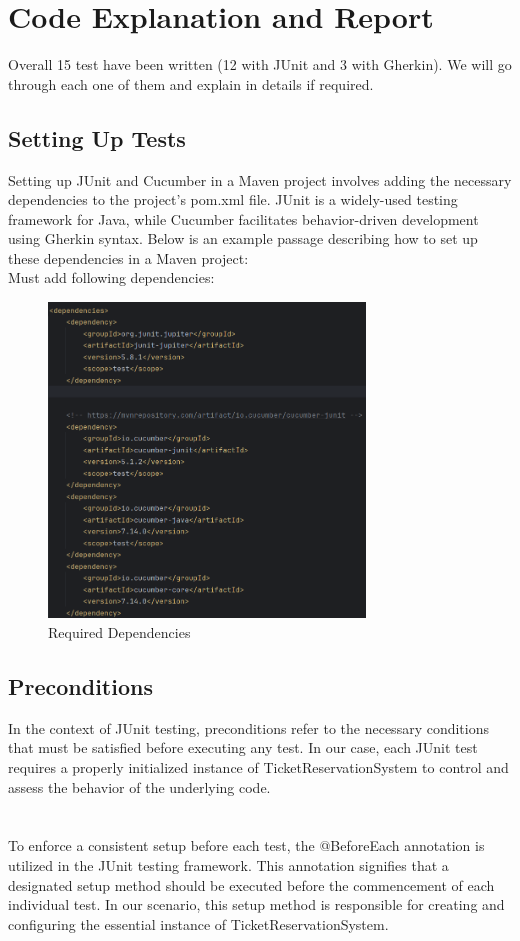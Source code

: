 \documentclass{article}
\begin{document}
\pagebreak


\section{Code Explanation and Report}
 Overall 15 test have been written (12 with JUnit and 3 with Gherkin). We will go through each one of them and explain in details if required.

 \bigskip

 \subsection{Setting Up Tests}
Setting up JUnit and Cucumber in a Maven project involves adding the necessary dependencies to the project's pom.xml file. JUnit is a widely-used testing framework for Java, while Cucumber facilitates behavior-driven development using Gherkin syntax. Below is an example passage describing how to set up these dependencies in a Maven project:\\

Must add following dependencies:
 \begin{figure}[h]
  \centering
  \includegraphics[width=0.75\textwidth]{pictures/deps.png}
  \caption{Required Dependencies}
  \label{fig:your_label}
\end{figure}

\pagebreak
 \subsection{Preconditions}
In the context of JUnit testing, preconditions refer to the necessary conditions that must be satisfied before executing any test. In our case, each JUnit test requires a properly initialized instance of TicketReservationSystem to control and assess the behavior of the underlying code. \\\\\\
To enforce a consistent setup before each test, the @BeforeEach annotation is utilized in the JUnit testing framework. This annotation signifies that a designated setup method should be executed before the commencement of each individual test. In our scenario, this setup method is responsible for creating and configuring the essential instance of TicketReservationSystem.
 \bigskip
\end{document}
